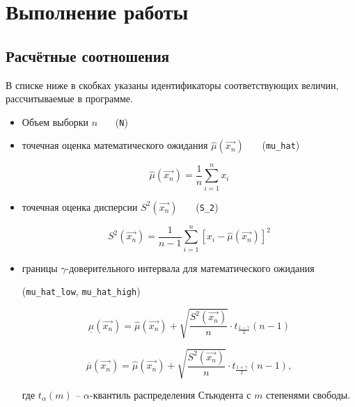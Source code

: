 \chapter{Выполнение работы}

\section{Расчётные соотношения}

В списке ниже в скобках указаны идентификаторы соответствующих величин, рассчитываемые в программе.

\begin{itemize}[$\bullet$]
	\item Объем выборки $n$ ~~~(\texttt{N})

	\item точечная оценка математического ожидания $\hat{\mu}(\overrightarrow{x_n})$ ~~~(\texttt{mu\_hat})
	
	\begin{equation}
		\hat{\mu}(\overrightarrow{x_n}) = \frac{1}{n} \sum_{i=1}^{n} x_i
	\end{equation}

	\item точечная оценка дисперсии $S^2(\overrightarrow{x_n})$ ~~~(\texttt{S\_2})
	
	\begin{equation}
		S^2(\overrightarrow{x_n}) = \frac{1}{n-1} \sum_{i=1}^{n} [x_i - \hat{\mu}(\overrightarrow{x_n})]^2
	\end{equation}

	\item границы $\gamma$-доверительного интервала для математического ожидания 
	
	(\texttt{mu\_hat\_low}, \texttt{mu\_hat\_high})
	
	\begin{equation}
		\underline{\mu}(\overrightarrow{x_n}) = \hat{\mu}(\overrightarrow{x_n}) + \sqrt{\frac{S^2(\overrightarrow{x_n})}{n}} \cdot t_{\frac{1 - \gamma}{2}}(n-1)
	\end{equation}

	\begin{equation}
		\overline{\mu}(\overrightarrow{x_n}) = \hat{\mu}(\overrightarrow{x_n}) + \sqrt{\frac{S^2(\overrightarrow{x_n})}{n}} \cdot t_{\frac{1 + \gamma}{2}}(n-1),
	\end{equation}

	где $t_{\alpha}(m)$ -- $\alpha$-квантиль распределения Стьюдента с $m$ степенями свободы.


\end{itemize}

